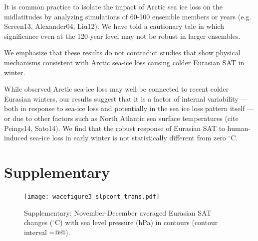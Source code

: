 \documentclass[grl]{AGUTeX}  %
\begin{document}
\begin{article}
It is common practice to isolate the impact of Arctic sea ice loss on the midlatitudes by analyzing simulations of 60-100 ensemble members or years (e.g. Screen13, Alexander04, Liu12). We have told a cautionary tale in which significance even at the 120-year level may not be robust in larger ensembles.

We emphasize that these results do not contradict studies that show physical mechanisms consistent with Arctic sea-ice loss causing colder Eurasian SAT in winter. 

While observed Arctic sea-ice loss may well be connected to recent colder Eurasian winters, our results suggest that it is a factor of internal variability --- both in response to sea-ice loss and potentially in the sea ice loss pattern itself --- or due to other factors such as North Atlantic sea surface temperatures (cite Peings14, Sato14). We find that the robust response of Eurasian SAT to human-induced sea-ice loss in early winter is not statistically different from zero $^\circ$C.


\section{Supplementary}

\begin{figure}[t]
  \noindent\texttt{[image: wacefigure3\_slpcont\_trans.pdf]} \\ 
  \caption{Supplementary: November-December averaged Eurasian SAT changes ($^\circ$C) with sea level pressure (hPa) in contours (contour interval =@@).
}\label{fig:figsup1}
\end{figure} %




\end{article}
\end{document}
